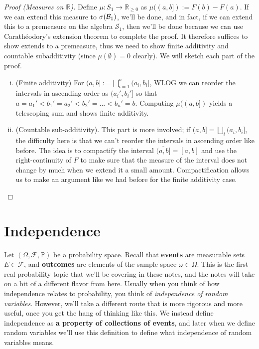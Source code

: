 \begin{proof}[Proof (Measures on $\mathbb R$)]
	Define $\mu : S_1\rightarrow\mathbb R_{\geq 0}$ as $\mu((a, b]) := F(b) - F(a)$. If we can extend this measure to $\sigma(\mathcal{B}_{1})$, we'll be done, and in fact, if we can extend this to a premeasure on the algebra $\overline{\mathcal S_1}$, then we'll be done because we can use Carath\'eodory's extension theorem to complete the proof. It therefore suffices to show extends to a premeasure, thus we need to show finite additivity and countable subadditivity (since $\mu(\emptyset) = 0$ clearly). We will sketch each part of the proof. 
	\begin{enumerate}[i)]
		\item (Finite additivity) For $(a, b] := \bigsqcup_{i = 1}^n (a_i, b_i]$, WLOG we can reorder the intervals in ascending order as $(a_i', b_i']$ so that $a = a_1' < b_1' = a_2' < b_2' = ... < b_n' = b$. Computing $\mu((a, b])$ yields a telescoping sum and shows finite additivity. 
		\item (Countable sub-additivity). This part is more involved; if $(a, b] = \bigsqcup_i (a_i, b_i]$, the difficulty here is that we can't reorder the intervals in ascending order like before. The idea is to compactify the interval $\overline{(a, b]} = [a, b]$ and use the right-continuity of $F$ to make sure that the measure of the interval does not change by much when we extend it a small amount. Compactification allows us to make an argument like we had before for the finite additivity case. 
	\end{enumerate}
\end{proof} 



\section{Independence}

Let $(\Omega, \mathcal F, \mathbb P)$ be a probability space. Recall that \textbf{events} are measurable sets $E\in\mathcal F$, and \textbf{outcomes} are elements of the sample space $\omega\in\Omega$. This is the first real probability topic that we'll be covering in these notes, and the notes will take on a bit of a different flavor from here. Usually when you think of how independence relates to probability, you think of \textit{independence of random variables}. However, we'll take a different route that is more rigorous and more useful, once you get the hang of thinking like this. We instead define independence as \textbf{a property of collections of events}, and later when we define random variables we'll use this definition to define what independence of random variables means. 

